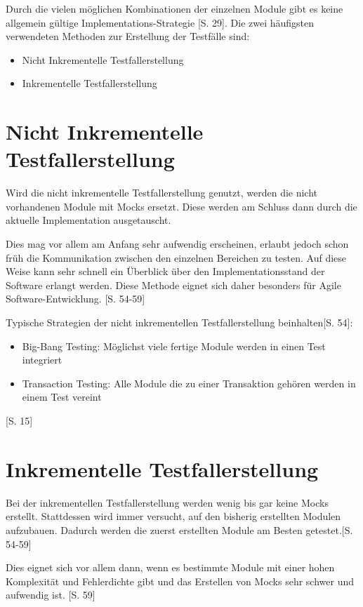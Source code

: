 \documentclass[a4paper,bibtotoc,oneside]{scrbook}
\begin{document}
Durch die vielen möglichen Kombinationen der einzelnen Module gibt es keine allgemein gültige Implementations-Strategie \cite{betrieb}[S. 29]. Die zwei häufigsten verwendeten Methoden zur Erstellung der Testfälle sind:

\begin{itemize}
	\item Nicht Inkrementelle Testfallerstellung
	\item Inkrementelle Testfallerstellung
\end{itemize}

\section{Nicht Inkrementelle Testfallerstellung}
Wird die nicht inkrementelle Testfallerstellung genutzt, werden die nicht vorhandenen Module mit Mocks ersetzt. Diese werden am Schluss dann durch die aktuelle Implementation ausgetauscht.

Dies mag vor allem am Anfang sehr aufwendig erscheinen, erlaubt jedoch schon früh die Kommunikation zwischen den einzelnen Bereichen zu testen. Auf diese Weise kann sehr schnell ein Überblick über den Implementationsstand der Software erlangt werden. Diese Methode eignet sich daher besonders für Agile Software-Entwicklung. \cite{test_large_systems}[S. 54-59] 

Typische Strategien der nicht inkrementellen Testfallerstellung beinhalten\cite{test_large_systems}[S. 54]:

\begin{itemize}
  \item Big-Bang Testing: Möglichst viele fertige Module werden in einen Test integriert
  \item Transaction Testing: Alle Module die zu einer Transaktion gehören werden in einem Test vereint
\end{itemize}

\cite{eval_regression}[S. 15]
\section{Inkrementelle Testfallerstellung}
Bei der inkrementellen Testfallerstellung werden wenig bis gar keine Mocks erstellt. Stattdessen wird immer versucht, auf den bisherig erstellten Modulen aufzubauen. Dadurch werden die zuerst erstellten Module am Besten getestet.\cite{test_large_systems}[S. 54-59]

Dies eignet sich vor allem dann, wenn es bestimmte Module mit einer hohen Komplexität und Fehlerdichte gibt und das Erstellen von Mocks sehr schwer und aufwendig ist. \cite{test_large_systems}[S. 59]
\end{document}
